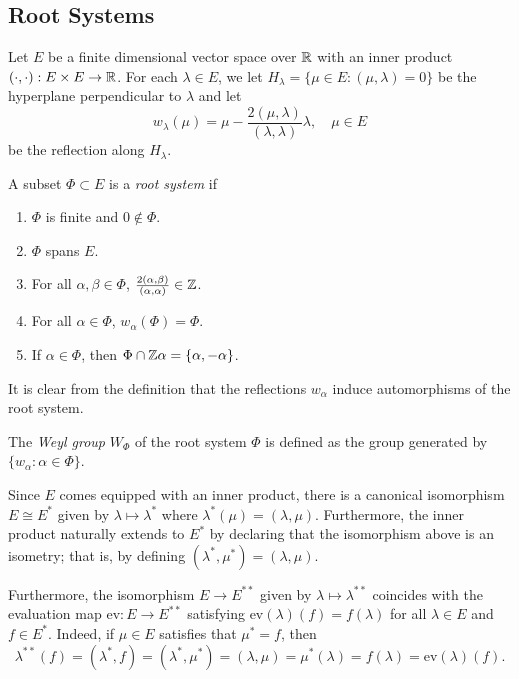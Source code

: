 \subsection{Root Systems}
Let $E$ be a finite dimensional vector space over $\mathbb{R}$ with an inner product $(\cdot,\cdot):E\times E\to\mathbb{R}$. For each $\lambda\in E$, we let $H_\lambda=\{\mu\in E:(\mu,\lambda)=0\}$ be the hyperplane perpendicular to $\lambda$ and let $$w_\lambda(\mu)=\mu-\frac{2(\mu,\lambda)}{(\lambda,\lambda)}\lambda,\quad \mu\in E$$ be the reflection along $H_\lambda$.
\begin{definition}
    A subset $\Phi\subset E$ is a \textit{root system} if
    \begin{enumerate}
        \item $\Phi$ is finite and $0\not\in\Phi$.
        \item $\Phi$ spans $E$.
        \item For all $\alpha,\beta\in\Phi$, $\frac{2(\alpha,\beta)}{(\alpha,\alpha)}\in\mathbb{Z}$.
        \item For all $\alpha\in\Phi$, $w_\alpha(\Phi)=\Phi$.
        \item If $\alpha\in\Phi$, then $\Phi\cap\mathbb{Z}\alpha=\{\alpha,-\alpha\}$.
    \end{enumerate}
\end{definition} 

It is clear from the definition that the reflections $w_\alpha$ induce automorphisms of the root system. 

\begin{definition}
    The \textit{Weyl group} $W_\Phi$ of the root system $\Phi$ is defined as the group generated by $\{w_\alpha:\alpha\in\Phi\}$.
\end{definition}

Since $E$ comes equipped with an inner product, there is a canonical isomorphism $E\cong E^*$ given by $\lambda\mapsto\lambda^*$ where $\lambda^*(\mu)=(\lambda,\mu)$. Furthermore, the inner product naturally extends to $E^*$ by declaring that the isomorphism above is an isometry; that is, by defining $(\lambda^*,\mu^*)=(\lambda,\mu)$. 

Furthermore, the isomorphism $E\rightarrow E^{**}$ given by $\lambda\mapsto\lambda^{**}$ coincides with the evaluation map $\mathrm{ev}:E\rightarrow E^{**}$ satisfying $\mathrm{ev}(\lambda)(f)=f(\lambda)$ for all $\lambda\in E$ and $f\in E^*$. Indeed, if $\mu\in E$ satisfies that $\mu^*=f$, then 
$$\lambda^{**}(f)=(\lambda^*,f)=(\lambda^*,\mu^*)=(\lambda,\mu)=\mu^*(\lambda)=f(\lambda)=\mathrm{ev}(\lambda)(f).$$

